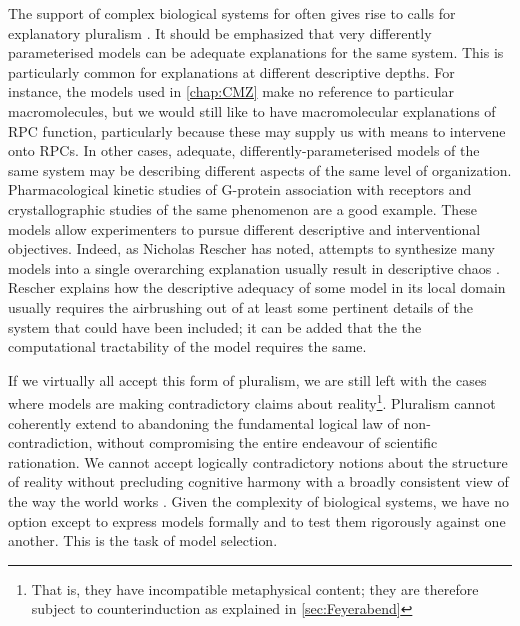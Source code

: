 The support of complex biological systems for  often gives rise to calls for explanatory pluralism \cite{Brigandt2010}. It should be emphasized that very differently parameterised models can be adequate explanations for the same system. This is particularly common for explanations at different descriptive depths. For instance, the models used in \autoref{chap:CMZ} make no reference to particular macromolecules, but we would still like to have macromolecular explanations of RPC function, particularly because these may supply us with means to intervene onto RPCs. In other cases, adequate, differently-parameterised models of the same system may be describing different aspects of the same level of organization. Pharmacological kinetic studies of G-protein association with receptors and crystallographic studies of the same phenomenon are a good example. These models allow experimenters to pursue different descriptive and interventional objectives. Indeed, as Nicholas Rescher has noted, attempts to synthesize many models into a single overarching explanation usually result in descriptive chaos \cite[p.65-6]{Rescher2000}. Rescher explains how the descriptive adequacy of some model in its local domain usually requires the airbrushing out of at least some pertinent details of the system that could have been included; it can be added that the the computational tractability of the model requires the same.

If we virtually all accept this form of pluralism, we are still left with the cases where models are making contradictory claims about reality\footnote{That is, they have incompatible metaphysical content; they are therefore subject to counterinduction as explained in \autoref{sec:Feyerabend}}. Pluralism cannot coherently extend to abandoning the fundamental logical law of non-contradiction, without compromising the entire endeavour of scientific rationation. We cannot accept logically contradictory notions about the structure of reality without precluding cognitive harmony with a broadly consistent view of the way the world works \cite{Rescher2005}. Given the complexity of biological systems, we have no option except to express models formally and to test them rigorously against one another. This is the task of model selection.

